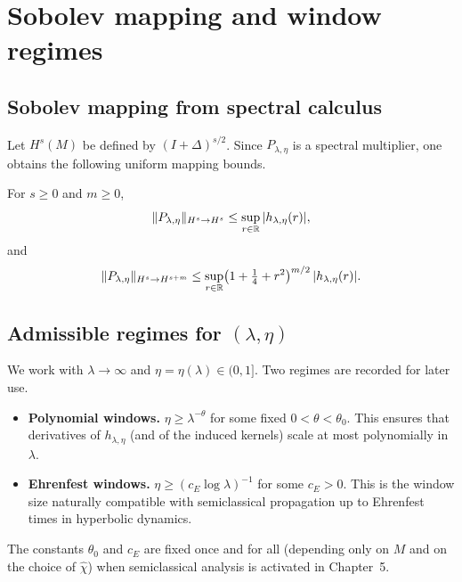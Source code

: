 \section{Sobolev mapping and window regimes}\label{sec:sp-sobolev}

\subsection{Sobolev mapping from spectral calculus}\label{subsec:sp-sobolev-map}

Let $H^s(M)$ be defined by $(I+\Delta)^{s/2}$. Since $P_{\lambda,\eta}$ is a spectral multiplier,
one obtains the following uniform mapping bounds.

\begin{lemma}\label{lem:sp-sobolev}
For $s\ge 0$ and $m\ge 0$,
\begin{equation}\label{eq:sp-sobolev-0}
\|P_{\lambda,\eta}\|_{H^s\to H^s}\le \sup_{r\in\mathbb{R}}|h_{\lambda,\eta}(r)|,
\end{equation}
and
\begin{equation}\label{eq:sp-sobolev-m}
\|P_{\lambda,\eta}\|_{H^s\to H^{s+m}}
\le
\sup_{r\in\mathbb{R}}\bigl(1+\tfrac14+r^2\bigr)^{m/2}\,|h_{\lambda,\eta}(r)|.
\end{equation}
\end{lemma}

\subsection{Admissible regimes for $(\lambda,\eta)$}\label{subsec:sp-regimes}

We work with $\lambda\to\infty$ and $\eta=\eta(\lambda)\in(0,1]$. Two regimes are recorded for later use.

\begin{itemize}
\item \textbf{Polynomial windows.} $\eta\ge \lambda^{-\theta}$ for some fixed $0<\theta<\theta_0$.
This ensures that derivatives of $h_{\lambda,\eta}$ (and of the induced kernels) scale at most polynomially in $\lambda$.
\item \textbf{Ehrenfest windows.} $\eta\ge (c_E\log\lambda)^{-1}$ for some $c_E>0$.
This is the window size naturally compatible with semiclassical propagation up to Ehrenfest times in hyperbolic dynamics.
\end{itemize}
The constants $\theta_0$ and $c_E$ are fixed once and for all (depending only on $M$ and on the choice of $\widehat\chi$)
when semiclassical analysis is activated in Chapter~5.

